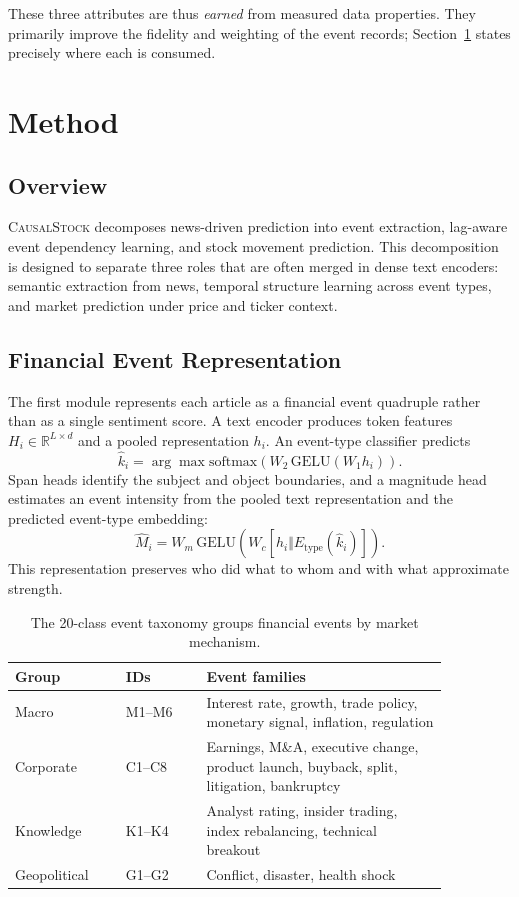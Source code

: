 \documentclass[sigconf,review]{acmart}
\begin{document}
These three attributes are thus \emph{earned} from measured data properties. They primarily improve the fidelity and weighting of the event records; Section~\ref{sec:method} states precisely where each is consumed.

\section{Method}
\label{sec:method}

\subsection{Overview}

\textsc{CausalStock} decomposes news-driven prediction into event extraction, lag-aware event dependency learning, and stock movement prediction. This decomposition is designed to separate three roles that are often merged in dense text encoders: semantic extraction from news, temporal structure learning across event types, and market prediction under price and ticker context.

\subsection{Financial Event Representation}

The first module represents each article as a financial event quadruple rather than as a single sentiment score. A text encoder produces token features $H_i\in\mathbb{R}^{L\times d}$ and a pooled representation $h_i$. An event-type classifier predicts
\begin{equation}
\hat{k}_i=\arg\max \mathrm{softmax}\left(W_2\,\mathrm{GELU}(W_1h_i)\right).
\end{equation}
Span heads identify the subject and object boundaries, and a magnitude head estimates an event intensity from the pooled text representation and the predicted event-type embedding:
\begin{equation}
\hat{M}_i=W_m\,\mathrm{GELU}\left(W_c[h_i \Vert E_{\mathrm{type}}(\hat{k}_i)]\right).
\end{equation}
This representation preserves who did what to whom and with what approximate strength.

\begin{table}[t]
\caption{The 20-class event taxonomy groups financial events by market mechanism.}
\label{tab:taxonomy}
\centering
\small
\begin{tabular}{p{0.22\linewidth}p{0.16\linewidth}p{0.48\linewidth}}
\toprule
Group & IDs & Event families \\
\midrule
Macro & M1--M6 & Interest rate, growth, trade policy, monetary signal, inflation, regulation \\
Corporate & C1--C8 & Earnings, M\&A, executive change, product launch, buyback, split, litigation, bankruptcy \\
Knowledge & K1--K4 & Analyst rating, insider trading, index rebalancing, technical breakout \\
Geopolitical & G1--G2 & Conflict, disaster, health shock \\
\bottomrule
\end{tabular}
\end{table}
\end{document}
